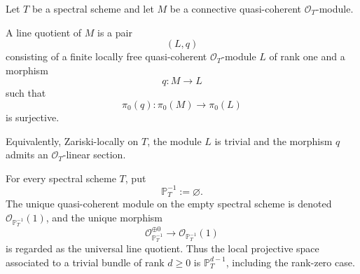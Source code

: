 \begin{definition}
\label{def:spectral-line-quotient}
Let \(T\) be a spectral scheme and let \(M\) be a connective
quasi-coherent \(\mathcal O_T\)-module.

A line quotient of \(M\) is a pair
\[
    (L,q)
\]
consisting of a finite locally free quasi-coherent
\(\mathcal O_T\)-module \(L\) of rank one and a morphism
\[
    q:M\longrightarrow L
\]
such that
\[
    \pi_0(q):
    \pi_0(M)
    \longrightarrow
    \pi_0(L)
\]
is surjective.

Equivalently, Zariski-locally on \(T\), the module \(L\) is trivial and the
morphism \(q\) admits an \(\mathcal O_T\)-linear section.
\end{definition}

\begin{convention}
\label{conv:rank-zero-projective-bundle}
For every spectral scheme \(T\), put
\[
    \mathbb P^{-1}_T
    :=
    \varnothing.
\]
The unique quasi-coherent module on the empty spectral scheme is denoted
\(\mathcal O_{\mathbb P^{-1}_T}(1)\), and the unique morphism
\[
    \mathcal O_{\mathbb P^{-1}_T}^{\oplus0}
    \longrightarrow
    \mathcal O_{\mathbb P^{-1}_T}(1)
\]
is regarded as the universal line quotient.  Thus the local projective
space associated to a trivial bundle of rank \(d\geq0\) is
\(\mathbb P^{d-1}_T\), including the rank-zero case.
\end{convention}

